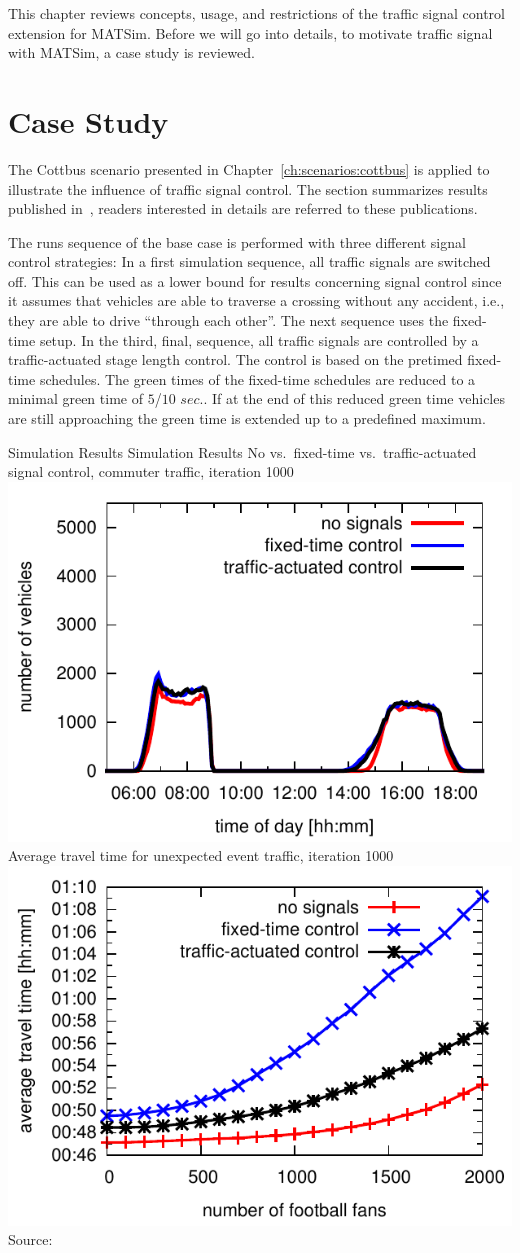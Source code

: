 This chapter reviews concepts, usage, and restrictions of the traffic signal control extension for MATSim. 
Before we will go into details, to motivate traffic signal with MATSim, a case study is reviewed. 

\section{Case Study}

The Cottbus scenario presented in Chapter~\ref{ch:scenarios:cottbus} is applied to illustrate the influence of traffic signal control. 
The section summarizes results published in~\citet{GretherBischoffNagel2011CottbusSylviaEventAbstract,Grether2014PhD}, readers interested in details are referred to these publications. 

%
The runs sequence of the base case is performed with three different signal control strategies:
%
In a first simulation sequence, all traffic signals are switched off. This can be used as a lower bound for results concerning signal control since it assumes that vehicles are able to traverse a crossing without any accident, i.e., they are able to drive ``through each other''. 
%
The next sequence uses the fixed-time setup. 
%
In the third, final, sequence, all traffic signals are controlled by a traffic-actuated stage length control. 
The control is based on the pretimed fixed-time schedules. 
The green times of the fixed-time schedules are reduced to a minimal green time of $5$/$10$ $sec.$. 
If at the end of this reduced green time vehicles are still approaching the green time is extended up to a predefined maximum. 

\createfigure%
{Simulation Results}%
{Simulation Results}%
{\label{fig:results_histogram}}
{%
  \createsubfigure%
  {No vs.~fixed-time vs.~traffic-actuated signal control, commuter traffic, iteration 1000}%
	{\includegraphics[width=0.48\linewidth]{extending/figures/signalslanes/leg_histogram_1292_1293_1291_it_1000.pdf}}
  {\label{fig:commuter_traffic}}%
  \createsubfigure%
	{Average travel time for unexpected event traffic, iteration 1000}
	{\includegraphics[width=0.48\linewidth]{extending/figures/signalslanes/average_travel_time_1220_1222.pdf}}
	{\label{fig:unexpected_event}}
}%
{Source:~\citet{Grether2014PhD}}

